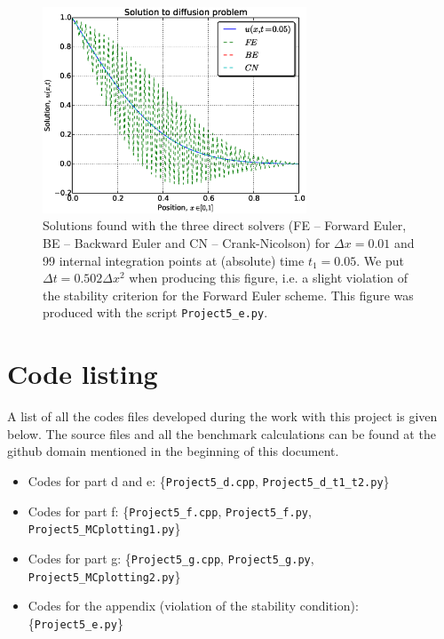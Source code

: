 \documentclass[a4paper, 11pt, notitlepage,english]{article}
\begin{document}
\begin{figure}[h!tb]
 \centering
 \includegraphics[width=0.7\textwidth]{Violate_Dt}
 \caption{Solutions found with the three direct solvers (FE – Forward Euler, BE – Backward Euler and CN – Crank-Nicolson) for $\Delta x = 0.01$ and 99 internal integration points at (absolute) time $t_1 = 0.05$. We put $\Delta t = 0.502 \Delta x^2$ when producing this figure, i.e. a slight violation of the stability criterion for the Forward Euler scheme. This figure was produced with the script \texttt{Project5\_e.py}. }
\label{fig:Dt_violation}
\end{figure}



\section*{Code listing}
A list of all the codes files developed during the work with this project is given below. The source files and all the benchmark calculations can be found at the github domain mentioned in the beginning of this document. \\

\begin{itemize}
\item Codes for part d and e: \{\texttt{Project5\_d.cpp}, \texttt{Project5\_d\_t1\_t2.py}\}

\item Codes for part f: \{\texttt{Project5\_f.cpp}, \texttt{Project5\_f.py}, \texttt{Project5\_MCplotting1.py}\}

\item Codes for part g: \{\texttt{Project5\_g.cpp}, \texttt{Project5\_g.py}, \texttt{Project5\_MCplotting2.py}\}

\item Codes for the appendix (violation of the stability condition): \{\texttt{Project5\_e.py}\}
\end{itemize}
\end{document}
